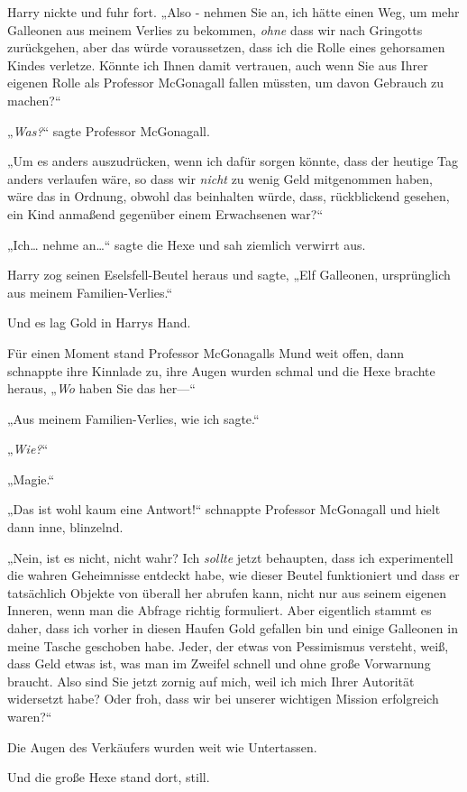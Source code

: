 {Harry nickte und fuhr fort. „Also - nehmen Sie an, ich hätte einen Weg, um mehr Galleonen aus meinem Verlies zu bekommen, \emph{ohne} dass wir nach Gringotts zurückgehen, aber das würde voraussetzen, dass ich die Rolle eines gehorsamen Kindes verletze. Könnte ich Ihnen damit vertrauen, auch wenn Sie aus Ihrer eigenen Rolle als Professor McGonagall fallen müssten, um davon Gebrauch zu machen?“

„\emph{Was?}“ sagte Professor McGonagall.

„Um es anders auszudrücken, wenn ich dafür sorgen könnte, dass der heutige Tag anders verlaufen wäre, so dass wir \emph{nicht} zu wenig Geld mitgenommen haben, wäre das in Ordnung, obwohl das beinhalten würde, dass, rückblickend gesehen, ein Kind anmaßend gegenüber einem Erwachsenen war?“

„Ich… nehme an…“ sagte die Hexe und sah ziemlich verwirrt aus.

Harry zog seinen Eselsfell-Beutel heraus und sagte, „Elf Galleonen, ursprünglich aus meinem Familien-Verlies.“

Und es lag Gold in Harrys Hand.

Für einen Moment stand Professor McGonagalls Mund weit offen, dann schnappte ihre Kinnlade zu, ihre Augen wurden schmal und die Hexe brachte heraus, „\emph{Wo} haben Sie das her—“

„Aus meinem Familien-Verlies, wie ich sagte.“

„\emph{Wie?}“

„Magie.“

„Das ist wohl kaum eine Antwort!“ schnappte Professor McGonagall und hielt dann inne, blinzelnd.

„Nein, ist es nicht, nicht wahr? Ich \emph{sollte} jetzt behaupten, dass ich experimentell die wahren Geheimnisse entdeckt habe, wie dieser Beutel funktioniert und dass er tatsächlich Objekte von überall her abrufen kann, nicht nur aus seinem eigenen Inneren, wenn man die Abfrage richtig formuliert. Aber eigentlich stammt es daher, dass ich vorher in diesen Haufen Gold gefallen bin und einige Galleonen in meine Tasche geschoben habe. Jeder, der etwas von Pessimismus versteht, weiß, dass Geld etwas ist, was man im Zweifel schnell und ohne große Vorwarnung braucht. Also sind Sie jetzt zornig auf mich, weil ich mich Ihrer Autorität widersetzt habe? Oder froh, dass wir bei unserer wichtigen Mission erfolgreich waren?“

Die Augen des Verkäufers wurden weit wie Untertassen.

Und die große Hexe stand dort, still.

}
